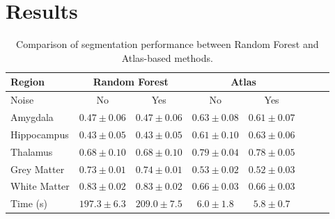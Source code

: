 \section{Results}

\setlength{\tabcolsep}{3pt}
\begin{table}[ht]
	\begin{flushleft}
		\caption{Comparison of segmentation performance between Random Forest and Atlas-based methods.}
		\begin{tabularx}{\linewidth}{Xccccccc}
			\toprule
			\multirow{2}{*}{Region} & \multicolumn{2}{c}{Random Forest} & \multicolumn{2}{c}{Atlas} \\ 
			\cmidrule(lr){2-3} \cmidrule(lr){4-5}
			\midrule
			Noise & No & Yes & No & Yes \\
			Amygdala & $0.47 \pm 0.06$ & $0.47 \pm 0.06$ & $\mathbf{0.63 \pm 0.08}$ & $0.61 \pm 0.07$ \\
			Hippocampus & $0.43 \pm 0.05$ & $0.43 \pm 0.05$ & $0.61 \pm 0.10$ & $\mathbf{0.63 \pm 0.06}$ \\
			Thalamus & $0.68 \pm 0.10$ & $0.68 \pm 0.10$ & $\mathbf{0.79\pm 0.04}$ & $0.78 \pm 0.05$ \\
			Grey Matter & $0.73 \pm 0.01$ & $\mathbf{0.74 \pm 0.01}$ & $0.53 \pm 0.02 $ & $0.52 \pm 0.03$ \\
			White Matter & $\mathbf{0.83 \pm 0.02}$ & $\mathbf{0.83 \pm 0.02}$ & $0.66 \pm 0.03$ & $0.66 \pm 0.03$ \\
			Time (s)  & $197.3 \pm 6.3$  & $209.0 \pm 7.5$  & $6.0 \pm 1.8$  & $\mathbf{5.8 \pm 0.7}$ \\
			\bottomrule
		\end{tabularx}
	\end{flushleft}	
	\label{tab:performance_comparison}
\end{table}

